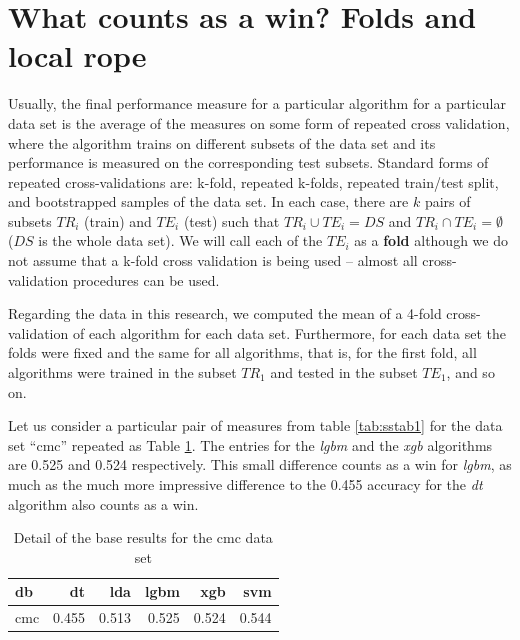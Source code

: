 \documentclass[twoside,11pt,preprint]{article}
\begin{document}
\hypertarget{what-counts-as-a-win-folds-and-local-rope}{%
\section{\texorpdfstring{What counts as a win? Folds and local rope \label{sec:lrope}}{What counts as a win? Folds and local rope }}\label{what-counts-as-a-win-folds-and-local-rope}}

Usually, the final performance measure for a particular algorithm for
a particular data set is the average of the measures on some form of
repeated cross validation, where the algorithm trains on different
subsets of the data set and its performance is measured on the
corresponding test subsets. Standard forms of repeated
cross-validations are: k-fold, repeated k-folds, repeated train/test
split, and bootstrapped samples of the data set. In each case, there
are \(k\) pairs of subsets \(TR_i\) (train) and \(TE_i\) (test) such that
\(TR_i \cup TE_i = DS\) and \(TR_i \cap TE_i = \emptyset\) (\(DS\) is the
whole data set). We will call each of the \(TE_i\) as a \textbf{fold}
although we do not assume that a k-fold cross validation is being
used -- almost all cross-validation procedures can be used.

Regarding the data in this research, we computed the mean of a 4-fold
cross-validation of each algorithm for each data set. Furthermore,
for each data set the folds were fixed and the same for all
algorithms, that is, for the first fold, all algorithms were trained
in the subset \(TR_1\) and tested in the subset \(TE_1\), and so on.

Let us consider a particular pair of measures from table \ref{tab:sstab1} for the
data set ``cmc'' repeated as Table \ref{tab:small1}. The entries for
the \emph{lgbm} and the \emph{xgb} algorithms are 0.525 and 0.524 respectively.
This small difference counts as a win for \emph{lgbm}, as much as the much
more impressive difference to the 0.455 accuracy for the \emph{dt}
algorithm also counts as a win.

\begin{table}

\caption{\label{tab:xsmall1}\label{tab:small1}Detail of the base results for the cmc data set}
\centering
\begin{tabular}[t]{lrrrrr}
\toprule
\textbf{db} & \textbf{dt} & \textbf{lda} & \textbf{lgbm} & \textbf{xgb} & \textbf{svm}\\
\midrule
cmc & 0.455 & 0.513 & 0.525 & 0.524 & 0.544\\
\bottomrule
\end{tabular}
\end{table}
\end{document}
